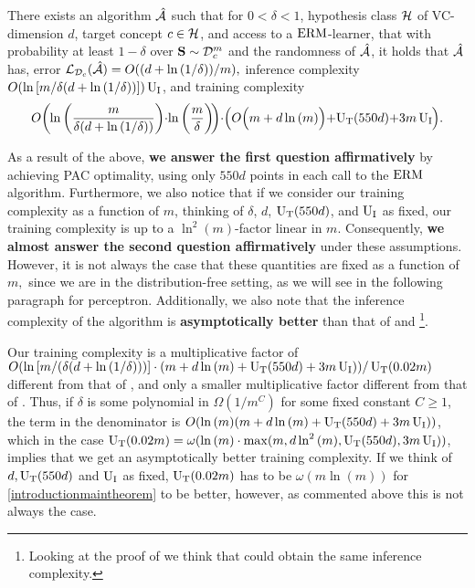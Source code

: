 \begin{theorem}\label{introductionmaintheorem}
There exists an algorithm $ \mathcal{\hat{A}} $ such that for $ 0< \delta <1 $, hypothesis class $ \mathcal{H} $ of VC-dimension $ d $, target concept $ c\in \mathcal{H} $, and access to a $ \mathrm{ERM} $-learner, that with probability at least $ 1-\delta $ over $ \mathbf{S} \sim \mathcal{D}_{c}^{m}$ and the randomness of $ \mathcal{\hat{A}} $, it holds that $ \mathcal{\hat{A}} $ has, error $ \operatorname{\mathcal{L}}_{\mathcal{D}_{c}}(\mathcal{\hat{A}})=O((d+\ln{\left(1/\delta \right)})/m),$ inference complexity $ O(\ln{[m /\delta(d+\ln{\left(1/\delta \right)}) ]}) \operatorname{U_{I}} $, and  training complexity 
\begin{align*}
    O\bigg(\negmedspace\ln{\bigg(\frac{m}{\delta(d+\ln{\left(1/\delta \right)})} \bigg)}\negmedspace\cdot\negmedspace\ln{\bigg(\frac{m}{\delta} \bigg)}\negmedspace\bigg)\negmedspace\cdot \negmedspace\Big(O\Big(m+d\ln{\left(m \right)}\Big)\negmedspace+\negmedspace\Utrain(550d)\negmedspace+\negmedspace 3m\Uinf\negmedspace\Big).
\end{align*}
         
\end{theorem}

As a result of the above, \textbf{we answer the first question affirmatively} by achieving PAC optimality, using only $550d$ points in each call to the $\mathrm{ERM}$ algorithm.
Furthermore, we also notice that if we consider our training complexity as a function of $ m $, thinking of $ \delta $, $ d $, $ \operatorname{U_{T}}(550d) $,  and $ \operatorname{U_{I}} $  as fixed, our training complexity is up to a $ \ln^{2}{\left(m \right)} $-factor linear in $ m $. Consequently, \textbf{we almost answer the second question affirmatively} under these assumptions. However, it is not always the case that these quantities are fixed as a function of $ m,$ since we are in the distribution-free setting, as we will see in the following paragraph for perceptron. 
Additionally, we also note that the inference complexity of the algorithm is \textbf{asymptotically better} than that of \cite{hannekeoptimal} and \cite{baggingoptimalPAClearner}\footnote{Looking at the proof of \cite{baggingoptimalPAClearner} we think that \cite{baggingoptimalPAClearner} could obtain the same inference complexity.}.  

Our training complexity is a multiplicative factor of  $ O(\ln{[m/(\delta(d+\ln{(1/\delta )}))]}\cdot(m+d\ln{(m )}+\operatorname{U_{T}}(550d)+3m\operatorname{U_{I}}))/\operatorname{U_{T}}(0.02m)$ different from that of \cite{baggingoptimalPAClearner}, and only a smaller multiplicative factor different from that of \cite{hannekeoptimal}. Thus, if $ \delta$ is some polynomial in $\Omega(1/m^{C}) $ for some fixed constant $ C \geq 1$, the term in the denominator is $O( \ln{\left(m \right)}(m+d\ln{\left(m \right)}+\operatorname{U_{T}}(550d)+3m\operatorname{U_{I}}) )$, which in the case $ \operatorname{U_{T}}(0.02m)=\omega(\ln{\left(m \right)}\cdot\max ( m , d\ln^{2}{\left(m \right)} , \operatorname{U_{T}}(550d), 3m \operatorname{U_{I}} )) $,  implies that we get an asymptotically better training complexity. If we think of $ d,\operatorname{U_{T}}(550d) $  and $ \operatorname{U_{I}} $ as fixed, $ \operatorname{U_{T}}(0.02m) $ has to be $ \omega(m\ln{\left(m \right)}) $ for \cref{introductionmaintheorem} to be better, however, as commented above this is not always the case.

